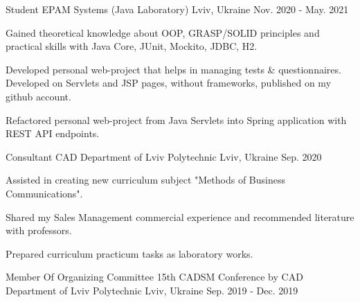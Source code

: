 

\begin{cventries}

  \cventry
    {Student} %
    {EPAM Systems (Java Laboratory)} %
    {Lviv, Ukraine} %
    {Nov. 2020 - May. 2021} %
    {
      \begin{cvitems} %
        \item {Gained theoretical knowledge about OOP, GRASP/SOLID principles and practical skills with Java Core, JUnit, Mockito, JDBC, H2.}
        \item {Developed personal web-project that helps in managing tests \& questionnaires. Developed on Servlets and JSP pages, without frameworks, published on my github account.}
        \item {Refactored personal web-project from Java Servlets into Spring application with REST API endpoints.}
      \end{cvitems}
    }
  \cventry
    {Consultant} %
    {CAD Department of Lviv Polytechnic} %
    {Lviv, Ukraine} %
    {Sep. 2020} %
    {
      \begin{cvitems} %
        \item {Assisted in creating new curriculum subject "Methods of Business Communications".}
        \item {Shared my Sales Management commercial experience and recommended literature with professors.}
        \item {Prepared curriculum practicum tasks as laboratory works.}
      \end{cvitems}
    }
  \cventry
    {Member Of Organizing Committee} %
    {15th CADSM Conference by CAD Department of Lviv Polytechnic } %
    {Lviv, Ukraine} %
    {Sep. 2019 - Dec. 2019} %

\end{cventries}
